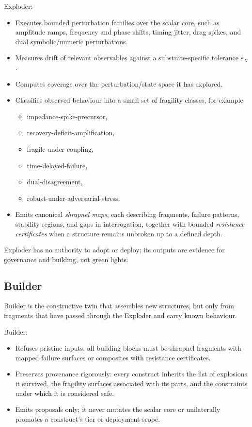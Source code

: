 \documentclass[11pt]{article}
\begin{document}
Exploder:
\begin{itemize}
  \item Executes bounded perturbation families over the scalar core, such as amplitude ramps, frequency and phase shifts, timing jitter, drag spikes, and dual symbolic/numeric perturbations.
  \item Measures drift of relevant observables against a substrate-specific tolerance \(\varepsilon_X\).
  \item Computes coverage over the perturbation/state space it has explored.
  \item Classifies observed behaviour into a small set of fragility classes, for example:
  \begin{itemize}
    \item impedance-spike-precursor,
    \item recovery-deficit-amplification,
    \item fragile-under-coupling,
    \item time-delayed-failure,
    \item dual-disagreement,
    \item robust-under-adversarial-stress.
  \end{itemize}
  \item Emits canonical \emph{shrapnel maps}, each describing fragments, failure patterns, stability regions, and gaps in interrogation, together with bounded \emph{resistance certificates} when a structure remains unbroken up to a defined depth.
\end{itemize}

Exploder has no authority to adopt or deploy; its outputs are evidence for governance and building, not green lights.

\subsection{Builder}

Builder is the constructive twin that assembles new structures, but only from fragments that have passed through the Exploder and carry known behaviour.

Builder:
\begin{itemize}
  \item Refuses pristine inputs; all building blocks must be shrapnel fragments with mapped failure surfaces or composites with resistance certificates.
  \item Preserves provenance rigorously: every construct inherits the list of explosions it survived, the fragility surfaces associated with its parts, and the constraints under which it is considered safe.
  \item Emits proposals only; it never mutates the scalar core or unilaterally promotes a construct's tier or deployment scope.
\end{itemize}
\end{document}
